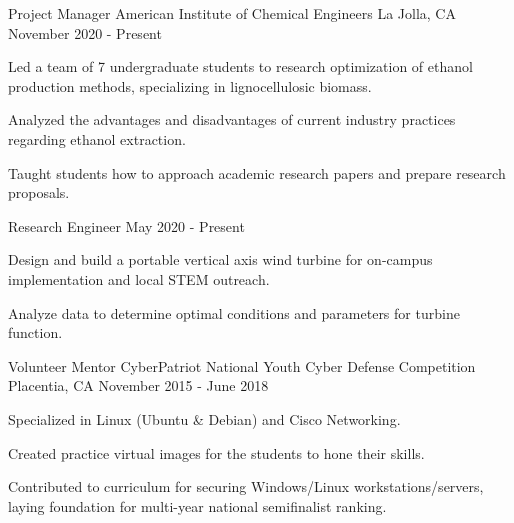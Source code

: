 \begin{cventries}
\cventrytwo
{Project Manager} %
{American Institute of Chemical Engineers} %
{La Jolla, CA} %
{November 2020 - Present} %
{
  \begin{cvitems} %
    \item {Led a team of 7 undergraduate students to research optimization of ethanol production methods, specializing in lignocellulosic biomass.}
    \item {Analyzed the advantages and disadvantages of current industry practices regarding ethanol extraction.}
    \item {Taught students how to approach academic research papers and prepare research proposals.}
  \end{cvitems}
}
    {Research Engineer} %
    {May 2020 - Present} %
    {
        \begin{cvitems} %
            \item {Design and build a portable vertical axis wind turbine for on-campus implementation and local STEM outreach.}
            \item {Analyze data to determine optimal conditions and parameters for turbine function.}
        \end{cvitems}
    }
 \cventry
    {Volunteer Mentor} %
    {CyberPatriot National Youth Cyber Defense Competition} %
    {Placentia, CA} %
    {November 2015 - June 2018} %
    {
      \begin{cvitems} %
        \item {Specialized in Linux (Ubuntu \& Debian) and Cisco Networking.}
        \item {Created practice virtual images for the students to hone their skills.}
        \item {Contributed to curriculum for securing Windows/Linux workstations/servers, laying foundation for multi-year national semifinalist ranking.}

\end{cvitems}}
\end{cventries}
